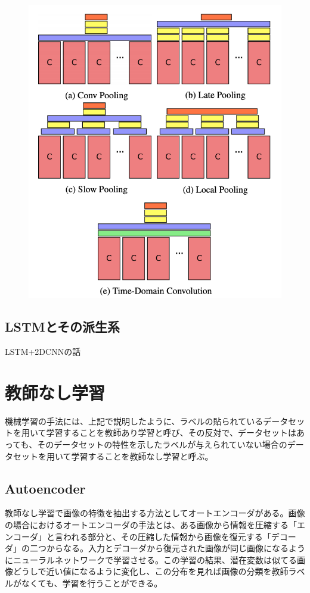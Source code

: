 \begin{figure}[h]
\centering
\includegraphics[width=0.7\linewidth]{fig/stacked_conv.png}
\caption{}
\label{fig:}
\end{figure}

\subsection{LSTMとその派生系}
LSTM+2DCNNの話

\section{教師なし学習}
機械学習の手法には、上記で説明したように、ラベルの貼られているデータセットを用いて学習することを教師あり学習と呼び、その反対で、データセットはあっても、そのデータセットの特性を示したラベルが与えられていない場合のデータセットを用いて学習することを教師なし学習と呼ぶ。

\subsection{Autoencoder}
教師なし学習で画像の特徴を抽出する方法としてオートエンコーダがある。画像の場合におけるオートエンコーダの手法とは、ある画像から情報を圧縮する「エンコーダ」と言われる部分と、その圧縮した情報から画像を復元する「デコーダ」の二つからなる。入力とデコーダから復元された画像が同じ画像になるようにニューラルネットワークで学習させる。この学習の結果、潜在変数は似てる画像どうしで近い値になるように変化し、この分布を見れば画像の分類を教師ラベルがなくても、学習を行うことができる。

